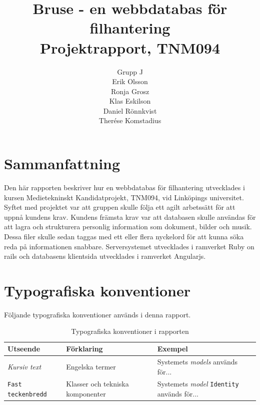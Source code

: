 \documentclass[a4paper,12pt,oneside,final]{extbook}
\title{Bruse - en webbdatabas för filhantering\\Projektrapport, TNM094}
\author{Grupp J\\Erik Olsson\\Ronja Grosz\\Klas Eskilson\\Daniel Rönnkvist\\Therése Komstadius}
\begin{document}
\pagestyle{empty}
\thispagestyle{empty}

\frontmatter

\maketitle

\pagestyle{fancy}

\chapter{Sammanfattning}
Den här rapporten beskriver hur en webbdatabas för filhantering utvecklades i kursen Medietekninskt Kandidatprojekt, TNM094, vid Linköpings universitet. Syftet med projektet var att gruppen skulle följa ett agilt arbetssätt för att uppnå kundens krav. Kundens främsta krav var att databasen skulle användas för att lagra och strukturera personlig information som dokument, bilder och musik. Dessa filer skulle sedan taggas med ett eller flera nyckelord för att kunna söka reda på informationen snabbare. Serversystemet utvecklades i ramverket Ruby on rails och databasens klientsida utvecklades i ramverket Angularjs.

\tableofcontents

\cleardoublepage
{}
\listoffigures

\cleardoublepage
{}
\listoftables

\chapter{Typografiska konventioner}
Följande typografiska konventioner används i denna rapport.

\begin{table}[h]
  \begin{centering}
    \begin{tabular}{|l|l|l|}
    \hline
    \textbf{Utseende} & \textbf{Förklaring} & \textbf{Exempel} \\
    \hline
    \emph{Kursiv text} & Engelska termer & Systemets \emph{models} används för... \\
    \hline
    \texttt{Fast teckenbredd} & Klasser och tekniska komponenter & Systemets \emph{model} \texttt{Identity} används för... \\
    \hline
    \end{tabular}
    \caption[Table caption text]{Typografiska konventioner i rapporten}
    \label{table:type}
  \end{centering}
\end{table}
\end{document}
